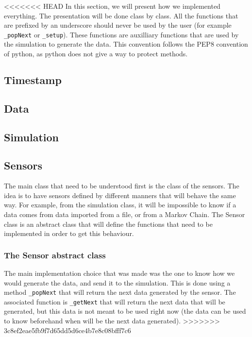 
<<<<<<< HEAD
In this section, we will present how we implemented everything. The presentation will be done class by class. All the functions that are prefixed by an underscore should never be used by the user (for example \verb!_popNext! or \verb!_setup!). These functions are auxilliary functions that are used by the simulation to generate the data. This convention follows the PEP8 convention of python, as python does not give a way to protect methods.

\subsection{Timestamp}



\subsection{Data}



\subsection{Simulation}


\subsection{Sensors}

The main class that need to be understood first is the class of the
sensors. The idea is to have sensors defined by different manners that will
behave the same way. For example, from the simulation class, it will be
impossible to know if a data comes from data imported from a file, or from
a Markov Chain. The Sensor class is an abstract class that will define the
functions that need to be implemented in order to get this behaviour.

\subsubsection{The Sensor abstract class}

The main implementation choice that was made was the one to know how we would
generate the data, and send it to the simulation. This is done using a method
\verb!_popNext! that will return the next data generated by the sensor. The
associated function is \verb!_getNext! that will return the next data that will
be generated, but this data is not meant to be used right now (the data can be
used to know beforehand when will be the next data generated).
>>>>>>> 3c8ef2eae5fb9f7d65dd5d6ce4b7e8c08bfff7c6

